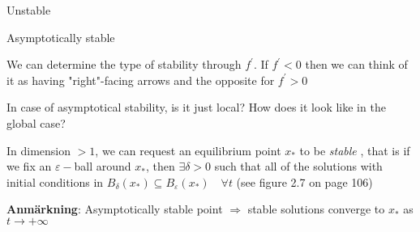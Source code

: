  Unstable
\par\bigskip
{} Asymptotically stable 
\par\bigskip
\noindent We can determine the type of stability through $f^{\prime}$. If $f^{\prime}<0$ then we can think of it as having "right"-facing arrows and the opposite for $f^{\prime}>0$
\par\bigskip
\noindent In case of asymptotical stability, is it just local? How does it look like in the global case?
\par\bigskip
\noindent In dimension $>1$, we can request an equilibrium point $x_*$ to be \textit{stable} , that is if we fix an $\varepsilon-$ball around $x_*$, then $\exists \delta>0$ such that all of the solutions with initial conditions in $B_{\delta}(x_*)\subseteq B_\varepsilon(x_*)\quad\forall t$ (see figure 2.7 on page 106)
\par\bigskip
\noindent\textbf{Anmärkning}: Asymptotically stable point $\Rightarrow$ stable solutions converge to $x_*$ as $t\to+\infty$
\par\bigskip
